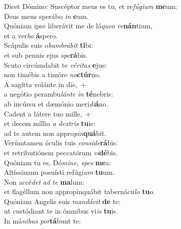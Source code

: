 \evenverse Dicet Dómino: Suscéptor meus es tu, et re\textit{fú}\textit{gi}\textit{um} \textbf{me}um:~\*\\
\evenverse Deus meus sperábo \textit{in} \textbf{e}um.\\
\oddverse Quóniam ipse liberávit me de lá\textit{que}\textit{o} \textit{ve}\textbf{nán}tium,~\*\\
\oddverse et a ver\textit{bo} \textbf{á}spero.\\
\evenverse Scápulis suis o\textit{bum}\textit{brá}\textit{bit} \textbf{ti}bi:~\*\\
\evenverse et sub pennis ejus \textit{spe}\textbf{rá}bis.\\
\oddverse Scuto circúmdabit te \textit{vé}\textit{ri}\textit{tas} \textbf{e}jus:~\*\\
\oddverse non timébis a timóre \textit{no}\textbf{ctúr}no.\\
\evenverse A sagítta volánte in die,~+\\
\evenverse  a negótio perambu\textit{lán}\textit{te} \textit{in} \textbf{té}nebris:~\*\\
\evenverse ab incúrsu et dæmónio meri\textit{di}\textbf{á}no.\\
\oddverse Cadent a látere tuo mille,~+\\
\oddverse  et decem míllia \textit{a} \textit{dex}\textit{tris} \textbf{tu}is:~\*\\
\oddverse ad te autem non appro\textit{pin}\textbf{quá}bit.\\
\evenverse Verúmtamen óculis tuis \textit{con}\textit{si}\textit{de}\textbf{rá}bis:~\*\\
\evenverse et retributiónem peccatórum \textit{vi}\textbf{dé}bis.\\
\oddverse Quóniam tu es, Dó\textit{mi}\textit{ne}, \textit{spes} \textbf{me}a:~\*\\
\oddverse Altíssimum posuísti refúgi\textit{um} \textbf{tu}um.\\
\evenverse Non accé\textit{det} \textit{ad} \textit{te} \textbf{ma}lum:~\*\\
\evenverse et flagéllum non appropinquábit tabernácu\textit{lo} \textbf{tu}o.\\
\oddverse Quóniam Angelis suis \textit{man}\textit{dá}\textit{vit} \textbf{de} te:~\*\\
\oddverse ut custódiant te in ómnibus vi\textit{is} \textbf{tu}is.\\
\evenverse In má\textit{ni}\textit{bus} \textit{por}\textbf{tá}bunt te:~\*\\
